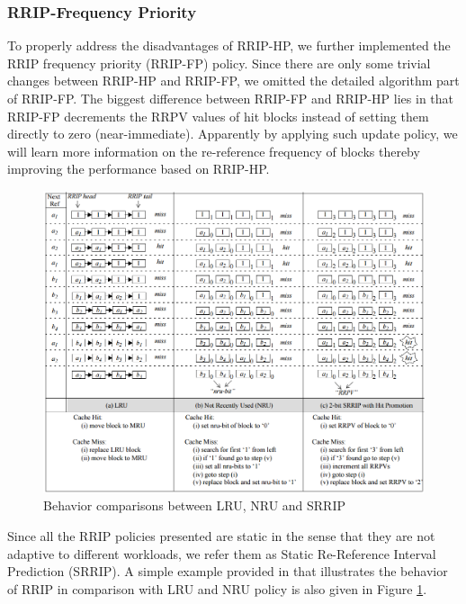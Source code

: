 \documentclass[conference]{IEEEtran}
\begin{document}
\subsubsection{RRIP-Frequency Priority}
To properly address the disadvantages of RRIP-HP, we further implemented the RRIP frequency priority (RRIP-FP) policy. Since there are only some trivial changes between RRIP-HP and RRIP-FP, we omitted the detailed algorithm part of RRIP-FP. The biggest difference between RRIP-FP and RRIP-HP lies in that RRIP-FP decrements the RRPV values of hit blocks instead of setting them directly to zero (near-immediate). Apparently by applying such update policy, we will learn more information on the re-reference frequency of blocks thereby improving the performance based on RRIP-HP. 
\begin{figure}
\begin{minipage}[!htbp]{1\linewidth}
\begin{center}
\includegraphics[width=1\textwidth]{policy_behavior.png} 
\caption{Behavior comparisons between LRU, NRU and SRRIP}\label{policy_behavior}
\end{center}	   
\end{minipage}
\end{figure}

Since all the RRIP policies presented are static in the sense that they are not adaptive to different workloads, we refer them as Static Re-Reference Interval Prediction (SRRIP). A simple example provided in \cite{jaleel2010high} that illustrates the behavior of RRIP in comparison with LRU and NRU policy is also given in Figure \ref{policy_behavior}.
\end{document}
